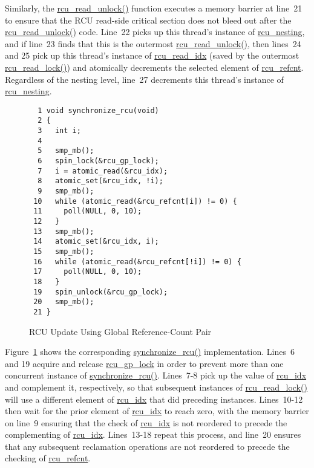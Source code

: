 Similarly, the \url{rcu_read_unlock()} function executes a memory barrier
at line~21
to ensure that the RCU read-side critical section does not bleed out
after the \url{rcu_read_unlock()} code.
Line~22 picks up this thread's instance of \url{rcu_nesting}, and if
line~23 finds that this is the outermost \url{rcu_read_unlock()},
then lines~24 and 25 pick up this thread's instance of \url{rcu_read_idx}
(saved by the outermost \url{rcu_read_lock()}) and atomically decrements
the selected element of \url{rcu_refcnt}.
Regardless of the nesting level, line~27 decrements this thread's
instance of \url{rcu_nesting}.

\begin{figure}[tbp]
{ \scriptsize
\begin{verbatim}
  1 void synchronize_rcu(void)
  2 {
  3   int i;
  4 
  5   smp_mb();
  6   spin_lock(&rcu_gp_lock);
  7   i = atomic_read(&rcu_idx);
  8   atomic_set(&rcu_idx, !i);
  9   smp_mb();
 10   while (atomic_read(&rcu_refcnt[i]) != 0) {
 11     poll(NULL, 0, 10);
 12   }
 13   smp_mb();
 14   atomic_set(&rcu_idx, i);
 15   smp_mb();
 16   while (atomic_read(&rcu_refcnt[!i]) != 0) {
 17     poll(NULL, 0, 10);
 18   }
 19   spin_unlock(&rcu_gp_lock);
 20   smp_mb();
 21 }
\end{verbatim}
}
\caption{RCU Update Using Global Reference-Count Pair}
\label{fig:app:rcuimpl:RCU Update Using Global Reference-Count Pair}
\end{figure}

Figure~\ref{fig:app:rcuimpl:RCU Update Using Global Reference-Count Pair}
shows the corresponding \url{synchronize_rcu()} implementation.
Lines~6 and 19 acquire and release \url{rcu_gp_lock} in order to
prevent more than one concurrent instance of \url{synchronize_rcu()}.
Lines~7-8 pick up the value of \url{rcu_idx} and complement it,
respectively, so that subsequent instances of \url{rcu_read_lock()}
will use a different element of \url{rcu_idx} that did preceding
instances.
Lines~10-12 then wait for the prior element of \url{rcu_idx} to
reach zero, with the memory barrier on line~9 ensuring that the check
of \url{rcu_idx} is not reordered to precede the complementing of
\url{rcu_idx}.
Lines~13-18 repeat this process, and line~20 ensures that any
subsequent reclamation operations are not reordered to precede the
checking of \url{rcu_refcnt}.

